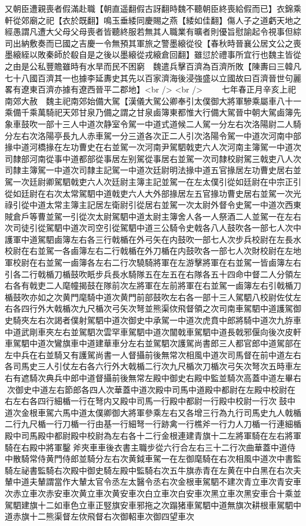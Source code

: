 又朝臣遭親喪者假滿赴職【朝直遥翻假古訝翻時魏不聽朝臣終喪給假而已】衣錦乘軒從郊廟之祀【衣於既翻】鳴玉垂緌同慶賜之燕【緌如佳翻】傷人子之道虧天地之經愚謂凡遭大父母父母喪者皆聽終服若無其人職業有曠者則優旨慰諭起令視事但綜司出納敷奏而已國之吉慶一令無預其軍旅之警墨縗從役【春秋時晉襄公居文公之喪墨縗絰以敗秦師於殽自是之後以墨縗從戎縗倉回翻】雖愆於禮事所宜行也魏主皆從之由是公私豐贍雖時有水旱而民不困窮　魏遣兵擊百濟為百濟所敗【陳夀曰三韓凡七十八國百濟其一也據李延夀史其先以百家濟海後浸強盛以立國故曰百濟晉世句麗畧有遼東百濟亦據有遼西晉平二郡地】<br />
<br />
　　七年春正月辛亥上祀南郊大赦　魏主祀南郊始備大駕【漢儀大駕公卿奉引太僕御大將軍驂乘屬車八十一乘備千乘萬騎祀天郊甘泉乃備之謂之甘泉鹵簿東都惟大行備大駕晉中朝大駕鹵簿先象車鼓吹一部十三人中道次静室令駕一中道式道候二人駕一分左右次洛陽尉二人騎分左右次洛陽亭長九人赤車駕一分三道各次正二人引次洛陽令駕一中道次河南中部掾中道河橋掾在左功曹史在右並駕一次河南尹駕駟戟吏六人次河南主簿駕一中道次司隸部河南從事中道都部從事居左别駕從事居右並駕一次司隸校尉駕三戟吏八人次司隸主簿駕一中道次司隸主記駕一中道次廷尉明法掾中道五官掾居左功曹史居右並駕一次廷尉卿駕駟戟吏六人次廷尉主簿主記並駕一在左太僕引從如廷尉在中宗正引從如廷尉在右次太常駕駟中道戟吏六人大外部掾居左五官掾功曹史居右並駕一次光祿引從中道太常主簿主記居左衛尉引從居右並駕一次太尉外督令史駕一中道次西東賊倉戶等曹並駕一引從次太尉駕駟中道太尉主簿舍人各一人祭酒二人並駕一在左右次司徒引從駕駟中道次司空引從駕駟中道三公騎令史戟各八人鼓吹各一部七人次中護軍中道駕駟鹵簿左右各三行戟楯在外弓矢在内鼓吹一部七人次步兵校尉在左長水校尉在右並駕一各鹵簿左右二行戟楯在外刀楯在内鼓吹各一部七人次財校尉在左地軍校尉在右並駕一鹵簿各左右二行次驍騎將軍在左游擊將軍在右並駕一皆鹵簿左右引各二行戟楯刀楯鼓吹眂步兵長水騎隊五在左五在右隊各五十四命中督二人分領左右各有戟吏二人麾幢揭鼓在隊前次左將軍在左前將軍在右並駕一鹵簿左右引戟楯刀楯鼓吹亦如之次黄門麾騎中道次黄門前部鼓吹左右各一部十三人駕駟八校尉佐仗左右各四行外大戟楯次九尺楯次弓矢次弩並熊渠佽飛督領之次司南車駕駟中道護駕御史騎夾左右次謁者僕射駕駟中道次御史中承駕一中道次虎賁中郎將騎中道次九斿車中道武剛車夾左右並駕駟次雲罕車駕駟中道次闟戟車駕駟中道長戟邪偃向後次皮軒車駕駟中道次鸞旗車中道建華車分左右並駕駟次護駕尚書郎三人都官郎中道駕部在左中兵在右並騎又有護駕尚書一人督攝前後無常次相風中道次司馬督在前中道左右各司馬史三人引仗左右各六行外大戟楯二行次九尺楯次刀楯次弓矢次弩次五時車左右有遮騎次典兵中郎中道督攝前後無常左殿中御史右殿中監並騎次高蓋中道左畢右次御史中道左右節郎各四人次華蓋中道次殿中司馬中道殿中都尉在左殿中校尉在右左右各四行細楯一行在弩内又殿中司馬一行殿中都尉一行殿中校尉一行次鼓中道次金根車駕六馬中道太僕卿御大將軍參乘左右又各增三行為九行司馬史九人戟楯二行九尺楯一行刀楯一行由基一行細弩一行跡禽一行樵斧一行力人刀楯一行連細楯殿中司馬殿中都尉殿中校尉為左右各十二行金根連建青旗十二左將軍騎在左右將軍騎在右殿中將軍鑿斧夾車車後衣書主職步從六行合左右三十二行次曲華蓋中道侍中散騎常侍黄門侍郎並騎分左右次黄鉞車駕一在左御麾騎在右次相風中道次中書監騎左祕書監騎右次殿中御史騎左殿中監騎右次五牛旗赤青在左黄在中白黑在右次夫輦中道夫輦謂當作大輦太官令丞左太醫令丞右次金根車駕駟不建次青立車次青安車次赤立車次赤安車次黄立車次黄安車次白立車次白安車次黑立車次黑安車合十乘並駕駟建旗十二如車色立車正竪旗安車邪拖之次蹋猪車駕駟中道無旗次耕根車駕駟中道赤旗十二熊渠督左佽飛督右次御軺車次御四望車次
